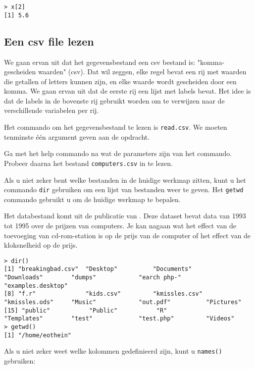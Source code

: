 \begin{lstlisting}
> x[2]
[1] 5.6
\end{lstlisting}

\subsection{Een csv file lezen}

We gaan ervan uit dat het gegevensbestand een csv bestand is: "komma-gescheiden waarden" (csv). Dat wil zeggen, elke regel bevat een rij met waarden die getallen of letters kunnen zijn, en elke waarde wordt gescheiden door een komma. We gaan ervan uit dat de eerste rij een lijst met labels bevat. Het idee is dat de labels in de bovenste rij gebruikt worden om te verwijzen naar de verschillende variabelen per rij.

Het commando om het gegevensbestand te lezen is \texttt{read.csv}. We moeten tenminste één argument geven aan de opdracht.

\begin{exercise}
  Ga met het help commando na wat de parameters zijn van het commando. Probeer daarna het bestand \texttt{computers.csv} in te lezen. 
\end{exercise}

Als u niet zeker bent welke bestanden in de huidige werkmap zitten, kunt u het commando \texttt{dir} gebruiken om een lijst van bestanden weer te geven. Het \texttt{getwd} commando gebruikt u om de huidige werkmap te bepalen.

Het databestand komt uit de publicatie van \autocite{Stengos2005}. Deze dataset bevat data van 1993 tot 1995 over de prijzen van computers. Je kan nagaan wat het effect van de toevoeging van cd-rom-station is op de prijs van de computer of  het effect van de kloksnelheid op de prijs. 

\begin{lstlisting}[breaklines=true]
> dir()
[1] "breakingbad.csv"  "Desktop"          "Documents"        "Downloads"        "dumps"            "earch php-"       "examples.desktop"
[8] "f.r"              "kids.csv"         "kmissles.csv"     "kmissles.ods"     "Music"            "out.pdf"          "Pictures"        
[15] "public"           "Public"           "R"                "Templates"        "test"             "test.php"         "Videos"          
> getwd()
[1] "/home/eothein"
\end{lstlisting}

Als u niet zeker weet welke kolommen gedefinieerd zijn, kunt u \texttt{names()} gebruiken:

